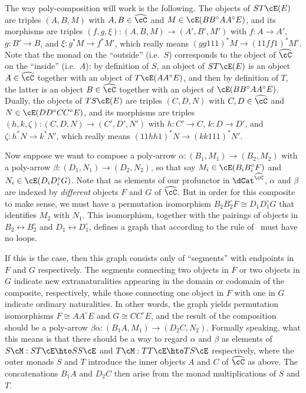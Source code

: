 \documentclass{amsart}
\newcommand{\C}{\cC}
\renewcommand{\Chat}{\ensuremath{\widehat{\C}}\xspace}
\newcommand{\E}{\cE}
\renewcommand{\o}{^{\circ}}
\begin{document}
The way poly-composition will work is the following.
The objects of $ST\E(E)$ are triples $(A,B,M)$ with $A,B\in \Chat$ and $M\in \E(B B\o A A\o E)$, and its morphisms are triples $(f,g,\xi):(A,B,M) \to (A',B',M')$ with $f:A\to A'$, $g:B'\to B$, and $\xi:g^*M \to f^*M'$, which really means $(gg111)^*M \to (11ff1)^*M'$.
Note that the monad on the ``outside'' (i.e.\ $S$) corresponds to the object of \Chat on the ``inside'' (i.e.\ $A$): by definition of $S$, an object of $ST\E(E)$ is an object $A\in\Chat$ together with an object of $T\E(A A\o E)$, and then by definition of $T$, the latter is an object $B\in\Chat$ together with an object of $\E(B B\o A A\o E)$.
Dually, the objects of $TS\E(E)$ are triples $(C,D,N)$ with $C,D\in \Chat$ and $N\in \E(D D\o C C\o E)$, and its morphisms are triples $(h,k,\zeta):(C,D,N) \to (C',D',N')$ with $h:C'\to C$, $k:D\to D'$, and $\zeta:h^*N \to k^*N'$, which really means $(11hh1)^*N \to (kk111)^*N'$.

Now suppose we want to compose a poly-arrow $\alpha : (B_1,M_1)\to (B_2,M_2)$ with a poly-arrow $\beta : (D_1,N_1) \to (D_2,N_2)$, so that say $M_i\in \E(B_i B_i\o F)$ and $N_i\in \E(D_i D_i\o G)$.
Note that as elements of our profunctor \cM in $\dCat^{\Chat}$, $\alpha$ and $\beta$ are indexed by \emph{different} objects $F$ and $G$ of \Chat.
But in order for this composite to make sense, we must have a permutation isomorphism $B_2 B_2\o F \cong D_1 D_1\o G$ that identifies $M_2$ with $N_1$.
This isomorphism, together with the pairings of objects in $B_2\leftrightarrow B_2\o$ and $D_1 \leftrightarrow D_1\o$, defines a graph that according to the rule of~\cite{ek:gen-funct-calc} must have no loops.

If this is the case, then this graph consists only of ``segments'' with endpoints in $F$ and $G$ respectively.
The segments connecting two objects in $F$ or two objects in $G$ indicate new extranaturalities appearing in the domain or codomain of the composite, respectively, while those connecting one object in $F$ with one in $G$ indicate ordinary naturalities.
In other words, the graph yields permutation isomorphisms $F \cong A A\o E$ and $G \cong C C\o E$, and the result of the composition should be a poly-arrow $\beta\alpha : (B_1 A, M_1) \to (D_2 C,N_2)$.
Formally speaking, what this means is that there should be a way to regard $\alpha$ and $\beta$ as elements of $S\cM : ST\E \hto SS\E$ and $T\cM : TT\E \hto TS\E$ respectively, where the outer monads $S$ and $T$ introduce the inner objects $A$ and $C$ of \Chat as above.
The concatenations $B_1 A$ and $D_2 C$ then arise from the monad multiplications of $S$ and $T$.
\end{document}
